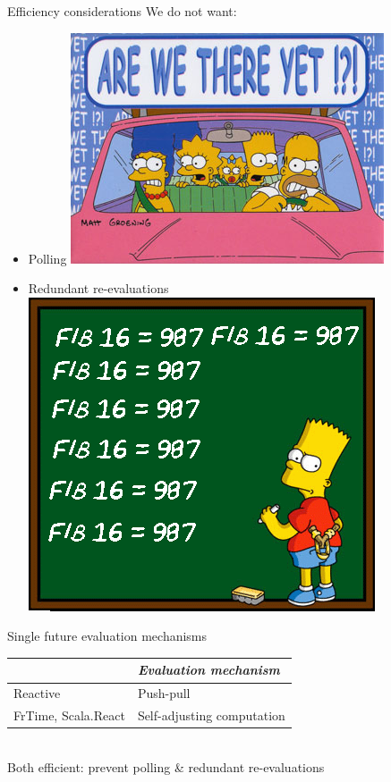 \documentclass{beamer}
\begin{document}
\begin{frame}{Efficiency considerations}
We do not want:

\begin{itemize}
\item Polling \hfill\includegraphics[scale=0.3]{are-we-there-yet.jpg}
\item Redundant re-evaluations\hfill\includegraphics[scale=0.3]{recompute.png}
\end{itemize}

\end{frame}

\begin{frame}{Single future evaluation mechanisms}

\begin{tabular}{l l}
&\emph{Evaluation mechanism} \\
\hline
Reactive & Push-pull \\
FrTime, Scala.React & Self-adjusting computation \\
\end{tabular}\\
\vspace{0.2cm}
Both efficient: prevent polling \& redundant re-evaluations
\end{frame}
\end{document}
